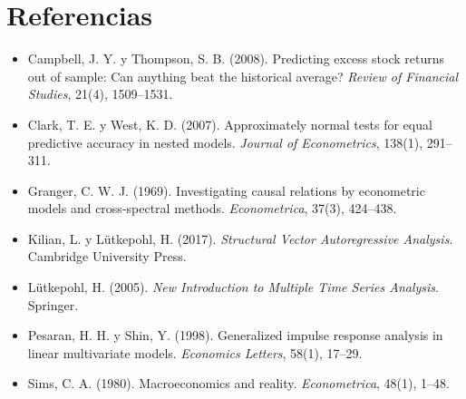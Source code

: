 \section*{Referencias}
\begin{itemize}[leftmargin=*]
  \item Campbell, J. Y. y Thompson, S. B. (2008). Predicting excess stock returns out of sample: Can anything beat
        the historical average? \emph{Review of Financial Studies}, 21(4), 1509--1531.
  \item Clark, T. E. y West, K. D. (2007). Approximately normal tests for equal predictive accuracy in nested
        models. \emph{Journal of Econometrics}, 138(1), 291--311.
  \item Granger, C. W. J. (1969). Investigating causal relations by econometric models and cross-spectral
        methods. \emph{Econometrica}, 37(3), 424--438.
  \item Kilian, L. y Lütkepohl, H. (2017). \emph{Structural Vector Autoregressive Analysis}. Cambridge University
        Press.
  \item Lütkepohl, H. (2005). \emph{New Introduction to Multiple Time Series Analysis}. Springer.
  \item Pesaran, H. H. y Shin, Y. (1998). Generalized impulse response analysis in linear multivariate models.
        \emph{Economics Letters}, 58(1), 17--29.
  \item Sims, C. A. (1980). Macroeconomics and reality. \emph{Econometrica}, 48(1), 1--48.
\end{itemize}
